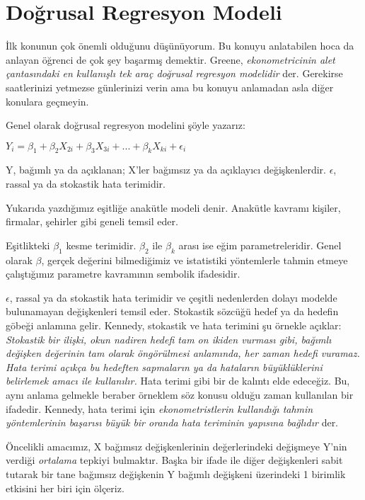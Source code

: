 \documentclass[
]{book}
\begin{document}
\hypertarget{doux11frusal-regresyon-modeli}{%
\chapter{Doğrusal Regresyon Modeli}\label{doux11frusal-regresyon-modeli}}

İlk konunun çok önemli olduğunu düşünüyorum. Bu konuyu anlatabilen hoca da anlayan öğrenci de çok şey başarmış demektir. Greene, \emph{ekonometricinin alet çantasındaki en kullanışlı tek araç doğrusal regresyon modelidir} der. Gerekirse saatlerinizi yetmezse günlerinizi verin ama bu konuyu anlamadan asla diğer konulara geçmeyin.

Genel olarak doğrusal regresyon modelini şöyle yazarız:

\(Y_i = \beta_1 + \beta_2X_{2i} + \beta_3X_{3i} + ... + \beta_kX_{ki} + \epsilon_i\)

Y, bağımlı ya da açıklanan; X'ler bağımsız ya da açıklayıcı değişkenlerdir. \(\epsilon\), rassal ya da stokastik hata terimidir.

Yukarıda yazdığımız eşitliğe anakütle modeli denir. Anakütle kavramı kişiler, firmalar, şehirler gibi geneli temsil eder.

Eşitlikteki \(\beta_1\) kesme terimidir. \(\beta_2\) ile \(\beta_k\) arası ise eğim parametreleridir. Genel olarak \(\beta\), gerçek değerini bilmediğimiz ve istatistiki yöntemlerle tahmin etmeye çalıştığımız parametre kavramının sembolik ifadesidir.

\(\epsilon\), rassal ya da stokastik hata terimidir ve çeşitli nedenlerden dolayı modelde bulunamayan değişkenleri temsil eder. Stokastik sözcüğü hedef ya da hedefin göbeği anlamına gelir. Kennedy, stokastik ve hata terimini şu örnekle açıklar: \emph{Stokastik bir ilişki, okun nadiren hedefi tam on ikiden vurması gibi, bağımlı değişken değerinin tam olarak öngörülmesi anlamında, her zaman hedefi vuramaz. Hata terimi açıkça bu hedeften sapmaların ya da hataların büyüklüklerini belirlemek amacı ile kullanılır.} Hata terimi gibi bir de kalıntı elde edeceğiz. Bu, aynı anlama gelmekle beraber örneklem söz konusu olduğu zaman kullanılan bir ifadedir. Kennedy, hata terimi için \emph{ekonometristlerin kullandığı tahmin yöntemlerinin başarısı büyük bir oranda hata teriminin yapısına bağlıdır} der.

Öncelikli amacımız, X bağımsız değişkenlerinin değerlerindeki değişmeye Y'nin verdiği \emph{ortalama} tepkiyi bulmaktır. Başka bir ifade ile diğer değişkenleri sabit tutarak bir tane bağımsız değişkenin Y bağımlı değişkeni üzerindeki 1 birimlik etkisini her biri için ölçeriz.
\end{document}
